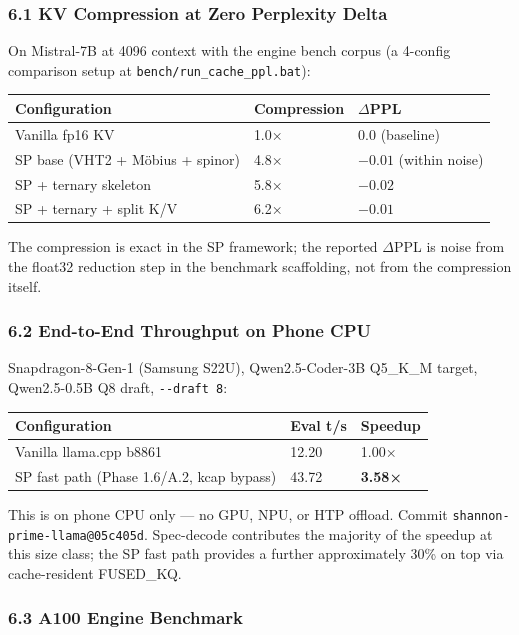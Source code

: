\documentclass[
  11pt,
]{article}
\begin{document}
\hypertarget{kv-compression-at-zero-perplexity-delta}{%
\subsubsection{6.1 KV Compression at Zero Perplexity
Delta}\label{kv-compression-at-zero-perplexity-delta}}

On Mistral-7B at 4096 context with the engine bench corpus (a 4-config
comparison setup at \texttt{bench/run\_cache\_ppl.bat}):

\begin{longtable}[]{@{}lll@{}}
\toprule
Configuration & Compression & \(\Delta\)PPL\tabularnewline
\midrule
\endhead
Vanilla fp16 KV & 1.0× & 0.0 (baseline)\tabularnewline
SP base (VHT2 + Möbius + spinor) & 4.8× & \(-0.01\) (within
noise)\tabularnewline
SP + ternary skeleton & 5.8× & \(-0.02\)\tabularnewline
SP + ternary + split K/V & 6.2× & \(-0.01\)\tabularnewline
\bottomrule
\end{longtable}

The compression is exact in the SP framework; the reported \(\Delta\)PPL
is noise from the float32 reduction step in the benchmark scaffolding,
not from the compression itself.

\hypertarget{end-to-end-throughput-on-phone-cpu}{%
\subsubsection{6.2 End-to-End Throughput on Phone
CPU}\label{end-to-end-throughput-on-phone-cpu}}

Snapdragon-8-Gen-1 (Samsung S22U), Qwen2.5-Coder-3B Q5\_K\_M target,
Qwen2.5-0.5B Q8 draft, \texttt{-\/-draft\ 8}:

\begin{longtable}[]{@{}lll@{}}
\toprule
Configuration & Eval t/s & Speedup\tabularnewline
\midrule
\endhead
Vanilla llama.cpp b8861 & 12.20 & 1.00×\tabularnewline
SP fast path (Phase 1.6/A.2, kcap bypass) & 43.72 &
\textbf{3.58×}\tabularnewline
\bottomrule
\end{longtable}

This is on phone CPU only --- no GPU, NPU, or HTP offload. Commit
\texttt{shannon-prime-llama@05c405d}. Spec-decode contributes the
majority of the speedup at this size class; the SP fast path provides a
further approximately 30\% on top via cache-resident FUSED\_KQ.

\hypertarget{a100-engine-benchmark}{%
\subsubsection{6.3 A100 Engine Benchmark}\label{a100-engine-benchmark}}
\end{document}
